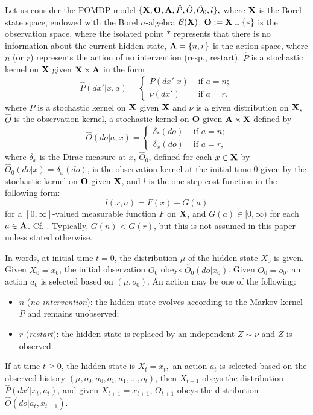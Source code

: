 \documentclass[letterpaper,10pt,conference]{ieeeconf}  %
\let\cal\mathcal
\begin{document}
Let us consider the POMDP model $\{{\bf X},{\bf O}, {\bf A}, \hat{P},\hat{O},\hat{O}_0, l\},$  
where ${\bf X}$ is the Borel state space, endowed with the Borel $\sigma$-algebra ${\cal B}({\bf X})$,
${\bf O}:={\bf X}\cup\{*\}$ is the observation space, where the isolated point $*$ represents that there is no information about the current hidden state, ${\bf A}=\{n,r\} $ is the action space, where $n$ (or $r$) represents the action of no intervention (resp., restart), 
$\hat{P}$ is a stochastic kernel on ${\bf X}$ given ${\bf X}\times {\bf A}$ in the form 
\[\hat{P}(dx'|x,a)=\begin{cases}
P(dx'|x) &\mbox{ if $a=n$};\\
\nu(dx') & \mbox{ if $a=r$,}
\end{cases}
\]
where $P$ is a stochastic kernel on ${\bf X}$ given $ {\bf X}$ and $\nu$ is a given distribution on ${\bf X}$, $\hat{O}$ is the observation kernel, a stochastic kernel on ${\bf O}$ given ${\bf A}\times {\bf X}$ defined by 
\[
\hat{O}(do|a,x)=\begin{cases}
\delta_{*}(do) &\mbox{ if $a=n$;}\\
\delta_x(do) &\mbox{ if $a=r$},
\end{cases}
\]
where $\delta_x$ is the Dirac measure at $x$, 
$\hat{O}_0$, defined for each $x\in {\bf X}$ by  $\hat{O}_0(do|x)=\delta_x(do)$, is the observation kernel at the initial time $0$ given by the stochastic kernel on ${\bf O}$ given ${\bf X}$, and $l$ is the one-step cost function in the following form: 
$$l(x,a)=F(x)+G(a)$$ for a $[0,\infty]$-valued measurable function $F$ on ${\bf X} $, and $G(a)\in[0,\infty)$ for each $a\in {\bf A}$.  Cf. \cite{Feinberg:2012}. Typically, $G(n) < G(r)$, but this is not assumed in this paper unless stated otherwise.

In words, at initial time $t=0$, the distribution $\mu$ of the hidden state $X_0$ is given. Given $X_0=x_0$, the initial observation $O_0$ obeys $\hat{O}_0(do|x_0)$. Given $O_0=o_0$, an action $a_0$ is selected based on $(\mu,o_0)$. An action may be one of the following:
\begin{itemize}
\item $n$ (\emph{no intervention}): the hidden state evolves according to the Markov kernel $P$ 
and remains unobserved;
\item $r$ (\emph{restart}): the hidden state is replaced by an independent $Z\sim \nu$ and $Z$ is observed.
\end{itemize}
If at time $t\ge 0$, the hidden state is $X_t=x_t,$ an action $a_t$ is selected based on the observed history $(\mu,o_0,a_0,o_1,a_1,\dots,o_t)$, then $X_{t+1}$ obeys the distribution $\hat{P}(dx'|x_t,a_t)$, and given $X_{t+1}=x_{t+1}$, $O_{t+1}$ obeys the distribution  $\hat{O}(do|a_t,x_{t+1}).$  
\end{document}
